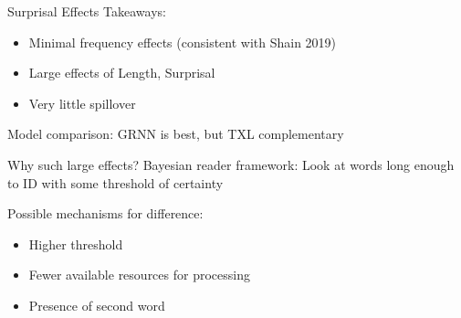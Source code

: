 \documentclass[12pt, xcolor=beamer,table,usenames,dvipsnames, ignorenonframetext, ngerman,t]{beamer}
\begin{document}
\begin{frame}{Surprisal Effects}
	Takeaways: \pause
	\begin{itemize}
		\item Minimal frequency effects (consistent with Shain 2019) \pause
		\item Large effects of Length, Surprisal \pause
		\item Very little spillover \pause
	\end{itemize}
%	
	Model comparison: GRNN is best, but TXL complementary
\end{frame}

\begin{frame}{Why such large effects?}
	\pause
	Bayesian reader framework: Look at words long enough to ID with some threshold of certainty \pause
	
Possible mechanisms for difference: \pause
\begin{itemize}
	\item Higher threshold \pause 
	\item Fewer available resources for processing \pause
	\item Presence of second word 
\end{itemize}

\end{frame}
\end{document}

